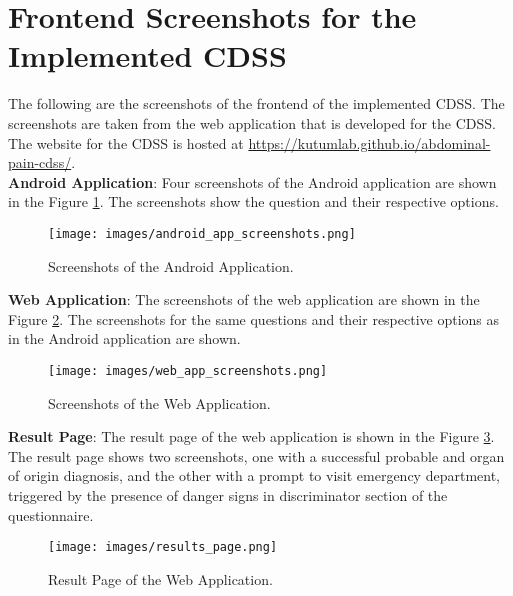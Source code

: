 \section{Frontend Screenshots for the Implemented CDSS}
\label{appendix:frontend_screenshots}
The following are the screenshots of the frontend of the implemented CDSS. The screenshots are taken from the web application that is developed for the CDSS. The website for the CDSS is hosted at \url{https://kutumlab.github.io/abdominal-pain-cdss/}.\\[\baselineskip]

\noindent \textbf{Android Application}: Four screenshots of the Android application are shown in the Figure \ref{fig:android_app_screenshots}. The screenshots show the question and their respective options.
\begin{figure}[H]
    \centering
    \texttt{[image: images/android\_app\_screenshots.png]}
    \caption{Screenshots of the Android Application.}
    \label{fig:android_app_screenshots}
\end{figure}

\noindent \textbf{Web Application}: The screenshots of the web application are shown in the Figure \ref{fig:web_app_screenshots}. The screenshots for the same questions and their respective options as in the Android application are shown.
\begin{figure}[H]
    \centering
    \texttt{[image: images/web\_app\_screenshots.png]}
    \caption{Screenshots of the Web Application.}
    \label{fig:web_app_screenshots}
\end{figure}

\noindent \textbf{Result Page}: The result page of the web application is shown in the Figure \ref{fig:results_page}. The result page shows two screenshots, one with a successful probable and organ of origin diagnosis, and the other with a prompt to visit emergency department, triggered by the presence of danger signs in discriminator section of the questionnaire.
\begin{figure}[H]
    \centering
    \texttt{[image: images/results\_page.png]}
    \caption{Result Page of the Web Application.}
    \label{fig:results_page}
\end{figure}
